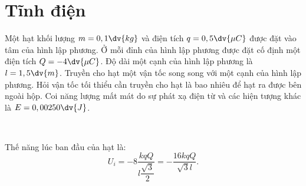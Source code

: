 \chapter{Tĩnh điện}
 \begin{vd}
    Một hạt khối lượng $m=0,1\dv{kg}$ và điện tích $q=0,5\dv{\mu C}$ được đặt vào tâm của hình lập phương. Ở mỗi đỉnh của hình lập phương được đặt cố định một điện tích $Q=-4\dv{\mu C}$. Độ dài một cạnh của hình lập phương là $l=1,5\dv{m}$. Truyền cho hạt một vận tốc song song với một cạnh của hình lập phương. Hỏi vận tốc tối thiểu cần truyền cho hạt là bao nhiêu để hạt ra được bên ngoài hộp. Coi năng lượng mất mát do sự phát xạ điện từ và các hiện tượng khác là $E=0,00250\dv{J}$.
    \end{vd}
    \begin{loigiai}
    \\
    \begin{minipage}{0.5\textwidth}
          Thế năng lúc ban đầu của hạt là: 
    $$
U_{i}=-8 \frac{k q Q}{l \dfrac{\sqrt{3}}{2}}=-\frac{16 k q Q}{\sqrt{3} l}.
$$
    \end{minipage}
    \begin{minipage}{0.5\textwidth}
         


\begin{tikzpicture}[x=0.75pt,y=0.75pt,yscale=-1,xscale=1]


\end{tikzpicture}
\end{minipage}
\end{loigiai}
